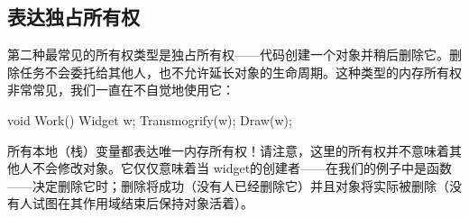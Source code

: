 \subsection{表达独占所有权}

第二种最常见的所有权类型是独占所有权——代码创建一个对象并稍后删除它。删除任务不会委托给其他人，也不允许延长对象的生命周期。这种类型的内存所有权非常常见，我们一直在不自觉地使用它：

\begin{code}
void Work() {
  Widget w;
  Transmogrify(w);
  Draw(w);
}
\end{code}

所有本地（栈）变量都表达唯一内存所有权！请注意，这里的所有权并不意味着其他人不会修改对象。它仅仅意味着当 widget的创建者——在我们的例子中是函数——决定删除它时；删除将成功（没有人已经删除它）并且对象将实际被删除（没有人试图在其作用域结束后保持对象活着）。

